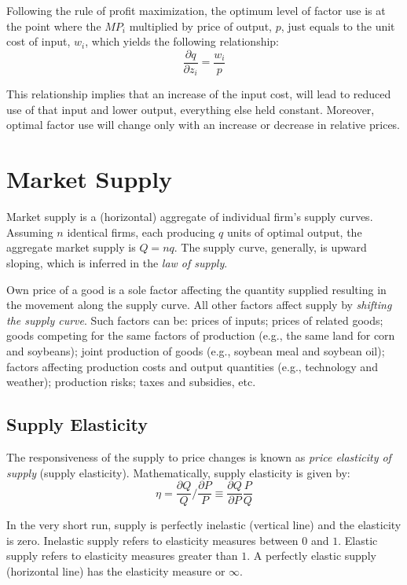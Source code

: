 \documentclass[]{book}
\begin{document}
Following the rule of profit maximization, the optimum level of factor
use is at the point where the \(MP_i\) multiplied by price of output,
\(p\), just equals to the unit cost of input, \(w_i\), which yields the
following
relationship:\[\frac{\partial q}{\partial z_i} = \frac{w_i}{p}\]

This relationship implies that an increase of the input cost, will lead
to reduced use of that input and lower output, everything else held
constant. Moreover, optimal factor use will change only with an increase
or decrease in relative prices.

\section{Market Supply}\label{market-supply}

Market supply is a (horizontal) aggregate of individual firm's supply
curves. Assuming \(n\) identical firms, each producing \(q\) units of
optimal output, the aggregate market supply is \(Q = nq\). The supply
curve, generally, is upward sloping, which is inferred in the \emph{law
of supply}.

Own price of a good is a sole factor affecting the quantity supplied
resulting in the movement along the supply curve. All other factors
affect supply by \emph{shifting the supply curve}. Such factors can be:
prices of inputs; prices of related goods; goods competing for the same
factors of production (e.g., the same land for corn and soybeans); joint
production of goods (e.g., soybean meal and soybean oil); factors
affecting production costs and output quantities (e.g., technology and
weather); production risks; taxes and subsidies, etc.

\subsection{Supply Elasticity}\label{supply-elasticity}

The responsiveness of the supply to price changes is known as
\emph{price elasticity of supply} (supply elasticity). Mathematically,
supply elasticity is given by:
\[\eta = \frac{\partial Q}{Q}/\frac{\partial P}{P} \equiv \frac{\partial Q}{\partial P}\frac{P}{Q}\]

In the very short run, supply is perfectly inelastic (vertical line) and
the elasticity is zero. Inelastic supply refers to elasticity measures
between \(0\) and \(1\). Elastic supply refers to elasticity measures
greater than \(1\). A perfectly elastic supply (horizontal line) has the
elasticity measure or \(\infty\).
\end{document}

